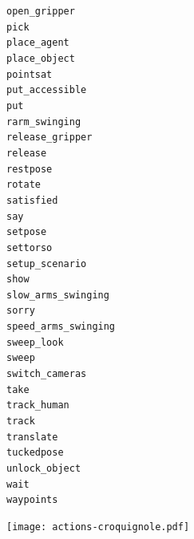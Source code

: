\documentclass[compress]{beamer}
\begin{document}
{{\begin{frame}{}
\begin{multicols}{4}
{\tt open\_gripper} \\
{\tt pick} \\
{\tt place\_agent} \\
{\tt place\_object} \\
{\tt pointsat} \\
{\tt put\_accessible} \\
{\tt put} \\
{\tt rarm\_swinging} \\
{\tt release\_gripper} \\
{\tt release} \\
{\tt restpose} \\
{\tt rotate} \\
{\tt satisfied} \\
{\tt say} \\
{\tt setpose} \\
{\tt settorso} \\
{\tt setup\_scenario} \\
{\tt show} \\
{\tt slow\_arms\_swinging} \\
{\tt sorry} \\
{\tt speed\_arms\_swinging} \\
{\tt sweep\_look} \\
{\tt sweep} \\
{\tt switch\_cameras} \\
{\tt take} \\
{\tt track\_human} \\
{\tt track} \\
{\tt translate} \\
{\tt tuckedpose} \\
{\tt unlock\_object} \\
{\tt wait} \\
{\tt waypoints} \\
    \end{multicols}
\end{frame}
}


{
\begin{frame}{}
    \centering
    \texttt{[image: actions-croquignole.pdf]}


\end{frame}}}
\end{document}
